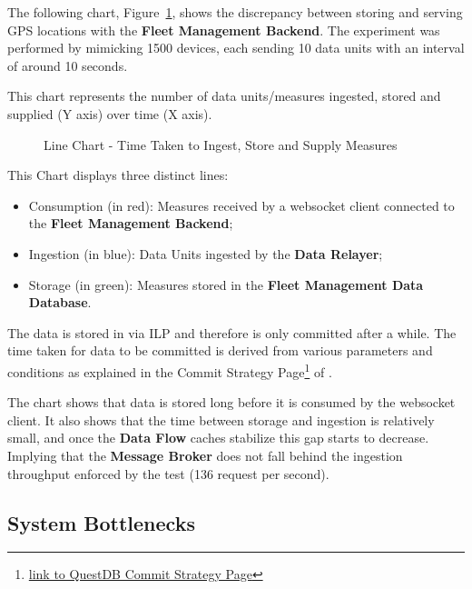 The following chart, Figure~\ref{fig:evaluation:overview:servicedatabase:chart:s4}, shows the discrepancy between storing and serving GPS locations with the \textbf{Fleet Management Backend}. The experiment was performed by mimicking 1500 devices, each sending 10 data units with an interval of around 10 seconds.

This chart represents the number of data units/measures ingested, stored and supplied (Y axis) over time (X axis). 

\begin{figure}[H]
    \centering
    
    \caption[Line Chart - Time Taken to Ingest, Store and Supply Measures]{Line Chart - Time Taken to Ingest, Store and Supply Measures}
    \label{fig:evaluation:overview:servicedatabase:chart:s4}
\end{figure}

This Chart displays three distinct lines:

\begin{itemize}
    \item Consumption (in red): Measures received by a websocket client connected to the \textbf{Fleet Management Backend}; 
    \item Ingestion (in blue): Data Units ingested by the \textbf{Data Relayer};
    \item Storage (in green): Measures stored in the \textbf{Fleet Management Data Database}.
\end{itemize}

The data is stored in  via \gls{ILP} and therefore is only committed after a while. The time taken for data to be committed is derived from various parameters and conditions as explained in the Commit Strategy Page\footnote{\href {https://questdb.io/docs/reference/api/ilp/tcp-receiver/\#commit-strategy}{link to QuestDB Commit Strategy Page}} of .

The chart shows that data is stored long before it is consumed by the websocket client. It also shows that the time between storage and ingestion is relatively small, and once the \textbf{Data Flow} caches stabilize this gap starts to decrease. Implying that the \textbf{Message Broker} does not fall behind the ingestion throughput enforced by the test (136 request per second).  

\subsection{System Bottlenecks}
\label{sec:evaluation:overview:bottlenecks}

